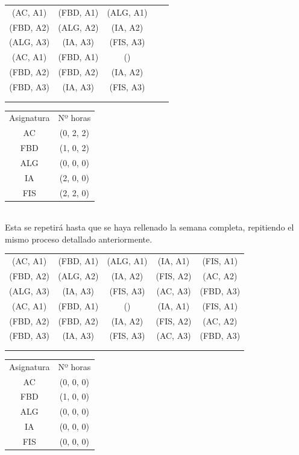 \begin{minipage}{0.7\textwidth}    
\begin{tabular}{| c | c | c | c | c |}
\hline
 (AC, A1) & (FBD, A1) & (ALG, A1) &  & \\
 (FBD, A2) & (ALG, A2) & (IA, A2) &  & \\
 (ALG, A3) &  (IA, A3) & (FIS, A3) &  & \\
 \hline
 (AC, A1) & (FBD, A1) & () &  & \\
 (FBD, A2) & (FBD, A2) & (IA, A2) &  & \\
 (FBD, A3) & (IA, A3) & (FIS, A3) &  & \\
 \hline
 &  &  &  & \\
 \hline
 &  &  &  & \\
 \hline 
\end{tabular}
\end{minipage}
\begin{minipage}{0.8\textwidth}
\begin{tabular}{c | c}
Asignatura & Nº horas \\
AC & (0, 2, 2) \\
FBD & (1, 0, 2) \\
ALG & (0, 0, 0) \\
IA & (2, 0, 0) \\
FIS & (2, 2, 0)
\end{tabular}
\end{minipage}
~\\

Esta se repetirá hasta que se haya rellenado la semana completa, repitiendo el mismo proceso detallado anteriormente. \\

\begin{minipage}{0.745\textwidth}    
\begin{tabular}{| c | c | c | c | c |}
\hline
 (AC, A1) & (FBD, A1) & (ALG, A1) & (IA, A1) & (FIS, A1) \\
 (FBD, A2) & (ALG, A2) & (IA, A2) & (FIS, A2) & (AC, A2) \\
 (ALG, A3) &  (IA, A3) & (FIS, A3) & (AC, A3) & (FBD, A3) \\
 \hline
 (AC, A1) & (FBD, A1) & () & (IA, A1) & (FIS, A1) \\
 (FBD, A2) & (FBD, A2) & (IA, A2) & (FIS, A2) & (AC, A2) \\
 (FBD, A3) & (IA, A3) & (FIS, A3) & (AC, A3) & (FBD, A3) \\
 \hline
 &  &  &  & \\
 \hline
 &  &  &  & \\
 \hline 
\end{tabular}
\end{minipage}
\begin{minipage}{1\textwidth}
\begin{tabular}{c | c}
Asignatura & Nº horas \\
AC & (0, 0, 0) \\
FBD & (1, 0, 0) \\
ALG & (0, 0, 0) \\
IA & (0, 0, 0) \\
FIS & (0, 0, 0)
\end{tabular}
\end{minipage}
~\\

